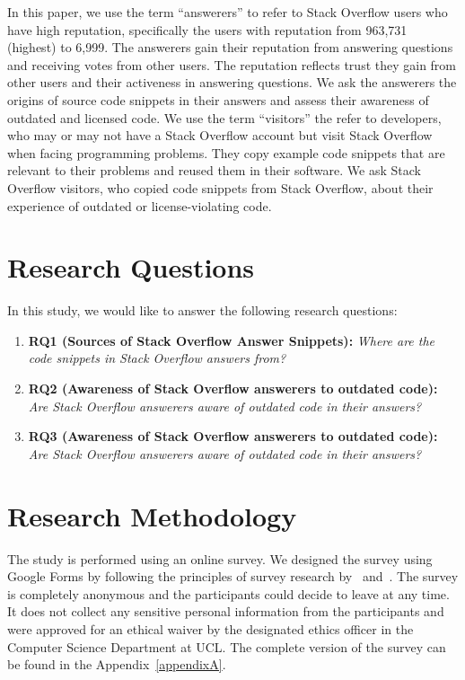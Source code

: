 \documentclass{svjour3}                     %
\begin{document}
In this paper, we use the term ``answerers'' to refer to Stack Overflow users
who have high reputation, specifically the users with reputation from 963,731
(highest)  to 6,999. The answerers gain their reputation from answering
questions and receiving votes from other users. The reputation reflects trust
they gain from other users and their activeness in answering questions. We ask
the answerers the origins of source code snippets in their answers  and assess
their awareness of outdated and licensed code. We use the term ``visitors'' the
refer to developers, who may or may not have a Stack Overflow account but visit
Stack Overflow when facing programming problems. They copy example code snippets
that are relevant to their problems and reused them in their software. 
We ask Stack Overflow visitors, who copied code snippets from
Stack Overflow, about their experience of outdated or license-violating code.

\section{Research Questions}
In this study, we would like to answer the following
research questions:

\begin{enumerate}
	\item \textbf{RQ1 (Sources of Stack Overflow Answer Snippets):} \textit{Where are the code snippets in Stack Overflow answers from?}
	\item \textbf{RQ2 (Awareness of Stack Overflow answerers to outdated code):} \textit{Are Stack Overflow answerers aware of outdated code in their answers?}
	\item \textbf{RQ3 (Awareness of Stack Overflow answerers to outdated code):} \textit{Are Stack Overflow answerers aware of outdated code in their answers?}
\end{enumerate}

\section{Research Methodology}
The study is performed using an online survey. We designed the survey using
Google Forms by following the principles of survey research
by~\cite{Pfleeger2001} and~\cite{Kitchenham2002}. 
The survey is completely anonymous and the participants could decide to leave at
any time. It does not collect any sensitive personal information from the
participants and were approved for an ethical waiver by the designated ethics
officer in the Computer Science Department at UCL.  The complete version of
the survey can be found in the Appendix~\ref{appendixA}.
\end{document}

